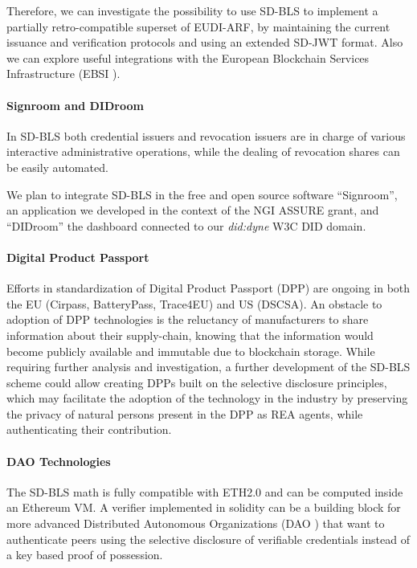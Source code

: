 Therefore, we can investigate the possibility to use SD-BLS to
implement a partially retro-compatible superset of EUDI-ARF, by
maintaining the current issuance and verification protocols and using
an extended SD-JWT format. Also we can explore useful integrations
with the European Blockchain Services Infrastructure (EBSI
\cite{ebsi}).

\paragraph{Signroom and DIDroom}

In SD-BLS both credential issuers and revocation issuers are in charge
of various interactive administrative operations, while the dealing of
revocation shares can be easily automated.

We plan to integrate SD-BLS in the free and open source software
``Signroom'', an application we developed in the context of the NGI
ASSURE grant, and ``DIDroom'' the dashboard connected to our
\emph{did:dyne} W3C DID domain.

\paragraph{Digital Product Passport}
Efforts in standardization of Digital Product Passport (DPP) are
ongoing in both the EU (Cirpass, BatteryPass, Trace4EU) and US
(DSCSA). An obstacle to adoption of DPP technologies is the reluctancy
of manufacturers to share information about their supply-chain,
knowing that the information would become publicly available and
immutable due to blockchain storage. While requiring further analysis
and investigation, a further development of the SD-BLS scheme could
allow creating DPPs built on the selective disclosure principles,
which may facilitate the adoption of the technology in the industry by
preserving the privacy of natural persons present in the DPP as REA
agents\cite{reflow}, while authenticating their contribution.

\paragraph{DAO Technologies}
The SD-BLS math is fully compatible with ETH2.0 and can be computed
inside an Ethereum VM. A verifier implemented in solidity can be a
building block for more advanced Distributed Autonomous Organizations
(DAO \cite{dao}) that want to authenticate peers using the selective
disclosure of verifiable credentials instead of a key based proof of
possession.


